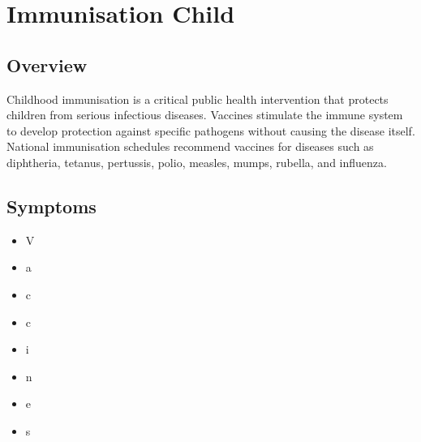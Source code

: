 \chapter{Immunisation Child}

\section*{Overview}
Childhood immunisation is a critical public health intervention that protects children from serious infectious diseases. Vaccines stimulate the immune system to develop protection against specific pathogens without causing the disease itself. National immunisation schedules recommend vaccines for diseases such as diphtheria, tetanus, pertussis, polio, measles, mumps, rubella, and influenza.

\section*{Symptoms}
\begin{itemize}
  \item V
\end{itemize}

\begin{itemize}
  \item a
\end{itemize}

\begin{itemize}
  \item c
\end{itemize}

\begin{itemize}
  \item c
\end{itemize}

\begin{itemize}
  \item i
\end{itemize}

\begin{itemize}
  \item n
\end{itemize}

\begin{itemize}
  \item e
\end{itemize}

\begin{itemize}
  \item s
\end{itemize}


